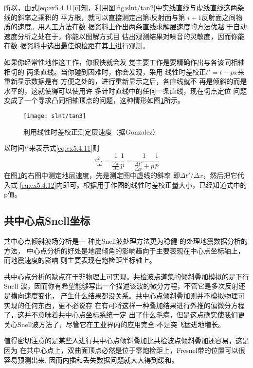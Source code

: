 所以，由式\ref{eq:ex5.4.11}可知，利用图\ref{fig:slnt/tan2}中实线直线与虚线直线这两条线的斜率之乘积的
平方根，就可以直接测定出第i反射面与第
$i+1$反射面之间物质的速度。用人工方法在数
据资料上作出两条直线求解层速度的方法优越
于自动速度分析之处在于，你能以图解方式目
估出观测结果对噪音的灵敏度，因而你能在数
据资料中选出最佳炮检距在其上进行观测。

如果你经常性地作这工作，你很快就会发
觉主要工作是要精确作出与各该同相轴相切的
两条直线。当你碰到困难时，你会发现，采用
线性时差校正$t'=t-px$来重新显示数据是有
方便之处的，进行重新显示之后，各直线就不
再是倾斜的而是水平的，这就使得可以使用许
多计时直线中的任何一条直线，现在切点定位
问题变成了一个寻求凸同相轴顶点的问题，这种情形如图\ref{fig:slnt/tan3}所示。

\begin{figure}[H]
\centering
\texttt{[image: slnt/tan3]}
\caption[tan3]{利用线性时差校正测定层速度（据Gonzalez）
}
\label{fig:slnt/tan3}
\end{figure}

以时间$t'$来表示式\ref{eq:ex5.4.11}则
\begin{equation}
v_{层}^2=\frac{1}{\frac{\Delta t}{\Delta x}}\frac{1}{p}
=\frac{1}{\frac{\Delta t'}{\Delta x}+p}\frac{1}{p}
\label{eq:ex5.4.12}
\end{equation}
在图\ref{fig:slnt/tan3}的右图中测定地层速度，先是测定图中虚线的斜率
即$\Delta t'/\Delta x$，然后把它代入式
\ref{eq:ex5.4.12}内即可。根据用于作图的线性时差校正量大小，已经知道式中的p值。

\subsection{共中心点Snell坐标}
\label{sec:5.4.2}

共中心点倾斜波场分析是一 种比Snell波处理方法更为稳健
的处理地震数据分析的方法，
中心点分析的好处是地层倾角的影响趋向于主要表现在中心点坐标轴上，而地震速度的影响
则主要表现在炮检距坐标轴上。

共中心点分析的缺点在于非物理上可实现。共检波点道集的倾斜叠加模拟的是下行Snell
波，因而你有希望能够写出一个描述该波的微分方程，不管它是多次反射还是横向速度变化，
产生什么结果都没关系。共中心点倾斜叠加则并不模拟物理可实现的任何东西，更不必说存
在有可将这样一种叠加结果进行外推的偏微分方程了，这并不意味着共中心点坐标系统一定
出了什么毛病，但是这点确实使我们更关心Snell波方法了，尽管它在工业界内的应用完全
不是突飞猛进地増长。

值得密切注意的是某些人进行共中心点倾斜叠加比共检波点倾斜叠加还容易，这是因为
在共中心点上，双曲面顶点必然是位于零炮检距上，Fresnel带的位置可以很容易预测出来,
因而内插和丢失数据问题就大大得到缓和。


